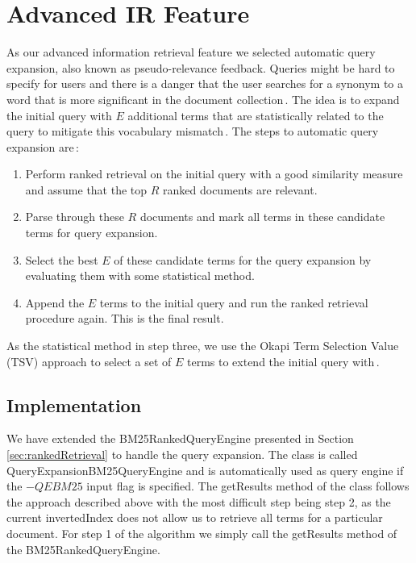 
\section{Advanced IR Feature}
\label{sec:advancedIRFeature}
As our advanced information retrieval feature we selected automatic query expansion, also known as pseudo-relevance feedback. Queries might be hard to specify for users and there is a danger that the user searches for a synonym to a word that is more significant in the document collection\,\cite{billerbeckzobel04}. The idea is to expand the initial query with $E$ additional terms that are statistically related to the query to mitigate this vocabulary mismatch\,\cite{billerbeckzobel04}. The steps to automatic query expansion are\,\cite{scholer13}: 

\begin{enumerate}
	\item Perform ranked retrieval on the initial query with a good similarity measure and assume that the top $R$ ranked documents are relevant.
	\item Parse through these $R$ documents and mark all terms in these candidate terms for query expansion.
	\item Select the best $E$ of these candidate terms for the query expansion by evaluating them with some statistical method.
	\item Append the $E$ terms to the initial query and run the ranked retrieval procedure again. This is the final result.
\end{enumerate}

As the statistical method in step three, we use the Okapi Term Selection Value (TSV) approach to select a set of $E$ terms to extend the initial query with\,\cite{billerbeckzobel04}\cite{Robertson_okapi/keenbowat}.

\subsection*{Implementation}
We have extended the BM25RankedQueryEngine presented in Section \ref{sec:rankedRetrieval} to handle the query expansion. The class is called QueryExpansionBM25QueryEngine and is automatically used as query engine if the $-QEBM25$ input flag is specified. The getResults method of the class follows the approach described above with the most difficult step being step 2, as the current invertedIndex does not allow us to retrieve all terms for a particular document. For step 1 of the algorithm we simply call the getResults method of the BM25RankedQueryEngine.

